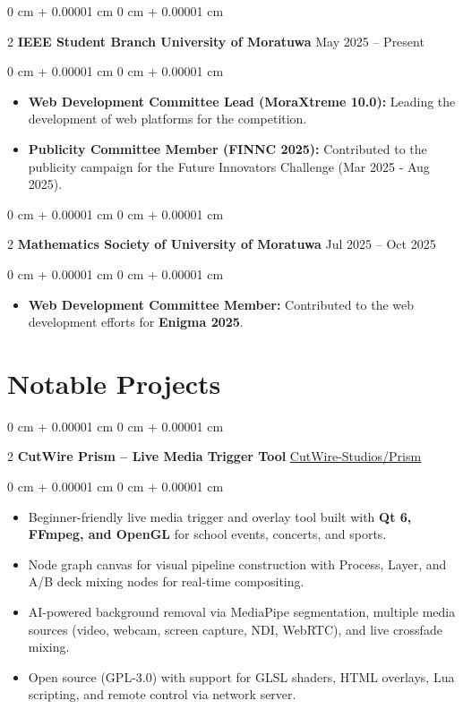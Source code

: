 \documentclass[10pt, letterpaper]{article}
\newenvironment{highlights}{ \begin{itemize}[ topsep=0.10 cm, parsep=0.10 cm, partopsep=0pt,
itemsep=0pt, leftmargin=0 cm + 10pt ] }{ \end{itemize} } %
\newenvironment{onecolentry}{ \begin{adjustwidth}{ 0 cm + 0.00001 cm }{ 0 cm + 0.00001 cm }
}{ \end{adjustwidth} } %
\newenvironment{twocolentry}[2][]{ \onecolentry \def\secondColumn{#2} \setcolumnwidth{\fill, 4.5 cm}
\begin{paracol}{2} }{ \switchcolumn \raggedleft \secondColumn \end{paracol}
\endonecolentry } %
\begin{document}
  \begin{twocolentry}
    {May 2025 -- Present} \textbf{IEEE Student Branch University of Moratuwa}
  \end{twocolentry}
  \vspace{0.10 cm}
  \begin{onecolentry}
    \begin{highlights}
      \item \textbf{Web Development Committee Lead (MoraXtreme 10.0):} Leading
      the development of web platforms for the competition. \item \textbf{Publicity
      Committee Member (FINNC 2025):} Contributed to the publicity campaign for
      the Future Innovators Challenge (Mar 2025 - Aug 2025).
    \end{highlights}
  \end{onecolentry}

  \vspace{0.2 cm}

  \begin{twocolentry}
    {Jul 2025 -- Oct 2025} \textbf{Mathematics Society of University of Moratuwa}
  \end{twocolentry}
  \vspace{0.10 cm}
  \begin{onecolentry}
    \begin{highlights}
      \item \textbf{Web Development Committee Member:} Contributed to the web development efforts for \textbf{Enigma 2025}.
    \end{highlights}
  \end{onecolentry}

  \section{Notable Projects}

  \begin{twocolentry}
    {\href{https://github.com/CutWire-Studios/Prism}{CutWire-Studios/Prism}} \textbf{CutWire Prism -- Live Media Trigger Tool}
  \end{twocolentry}
  \vspace{0.10 cm}
  \begin{onecolentry}
    \begin{highlights}
      \item Beginner-friendly live media trigger and overlay tool built with \textbf{Qt 6, FFmpeg, and OpenGL} for school events, concerts, and sports.
      \item Node graph canvas for visual pipeline construction with Process, Layer, and A/B deck mixing nodes for real-time compositing.
      \item AI-powered background removal via MediaPipe segmentation, multiple media sources (video, webcam, screen capture, NDI, WebRTC), and live crossfade mixing.
      \item Open source (GPL-3.0) with support for GLSL shaders, HTML overlays, Lua scripting, and remote control via network server.
    \end{highlights}
  \end{onecolentry}
\end{document}

